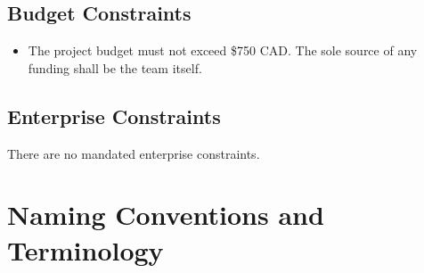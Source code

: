 \documentclass[12pt]{article}
\begin{document}
\subsection{Budget Constraints}
\begin{itemize}
  \item The project budget must not exceed \$750 CAD. The sole source of any funding shall be the team itself. 
\end{itemize}
\subsection{Enterprise Constraints}
There are no mandated enterprise constraints.
\section{Naming Conventions and Terminology}
\end{document}
